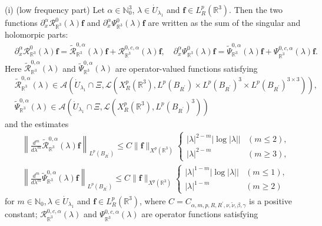 \documentclass[10pt,a4paper]{amsart}
\begin{document}
\begin{prop}
\noindent
{\rm (i) (low frequency part)} Let $\alpha\in\mathbb{N}_0^3$, $\lambda\in \Dot{U}_{\lambda_1}$ and $\mathbf{f}\in L_R^p(\mathbb{R}^3)$. Then the two functions $\partial_x^\alpha \mathcal{R}_{\mathbb{R}^3}^0(\lambda)\mathbf{f}$ and $\partial_x^\alpha \Psi_{\mathbb{R}^3}^0(\lambda)\mathbf{f}$ are written as the sum of the singular and  holomorpic parts:
\begin{align*}
&\partial_x^\alpha \mathcal{R}_{\mathbb{R}^3}^0(\lambda)\mathbf{f}=\widetilde{\mathcal{R}}_{\mathbb{R}^3}^{0,\alpha}(\lambda)\mathbf{f}+\mathcal{R}_{\mathbb{R}^3}^{0,c,\alpha}(\lambda)\mathbf{f}, \quad
\partial_x^\alpha \Psi_{\mathbb{R}^3}^0(\lambda)\mathbf{f}=\widetilde{\Psi}_{\mathbb{R}^3}^{0,\alpha}(\lambda)\mathbf{f}+\Psi_{\mathbb{R}^3}^{0,c,\alpha}(\lambda)\mathbf{f}. 
\end{align*}
Here $\widetilde{\mathcal{R}}_{\mathbb{R}^3}^{0,\alpha}(\lambda)$ and $\widetilde{\Psi}_{\mathbb{R}^3}^{0,\alpha}(\lambda)$ are operator-valued functions satisfying 
\begin{align*}
&\widetilde{\mathcal{R}}_{\mathbb{R}^3}^{0,\alpha}(\lambda)\in \mathcal{A}(\dot{U}_{\lambda_1}\cap \Xi, \mathcal{L}(X_R^{p}(\mathbb{R}^3),L^{p}(B_{R^\prime})\times L^{p}(B_{R^\prime})^3 \times L^{p}(B_{R^\prime})^{3\times3} ) ),\\
&\widetilde{\Psi}_{\mathbb{R}^3}^{0,\alpha}(\lambda)\in \mathcal{A}(\dot{U}_{\lambda_1}\cap \Xi, \mathcal{L}(X_R^{p}(\mathbb{R}^3),L^{p}(B_{R^\prime})^3 ) )
\end{align*}
and the estimates
\begin{align*}
&\left\|\frac{d^m }{d\lambda^m}\widetilde{\mathcal{R}}_{\mathbb{R}^3}^{0,\alpha}(\lambda)\mathbf{f} \right\|_{L^p(B_{R^\prime})}\leq C\|\mathbf{f}\|_{X^p(\mathbb{R}^3)}
\begin{cases}
|\lambda|^{2-m} \left|\log |\lambda|\right| & (m\le 2), \\
|\lambda|^{2-m} &(m\ge3),
\end{cases}  
\\
& \left\| \frac{d^m}{d\lambda^m}\widetilde{\Psi}_{\mathbb{R}^3}^{0,\alpha} (\lambda)\mathbf{f}\right\|_{L^p( B_{R^\prime})} 
\le C\|\mathbf{f}\|_{X^p(\mathbb{R}^3)}
\begin{cases}
|\lambda|^{1-m}\left|\log |\lambda|\right| & (m\le 1), \\
|\lambda|^{1-m} &(m\ge2)
\end{cases}
\end{align*}
for $m\in\mathbb{N}_0, \lambda\in \Dot{U}_{\lambda_1}$ and $\mathbf{f}\in L_R^p(\mathbb{R}^3)$, where $C=C_{\alpha,m,p,R,R^\prime,\nu,\tilde{\nu},\beta,\gamma}$ is a positive constant; $\mathcal{R}_{\mathbb{R}^3}^{0,c,\alpha}(\lambda)$ and $\Psi_{\mathbb{R}^3}^{0,c,\alpha}(\lambda)$ are operator functions satisfying 

\end{prop}
\end{document}
